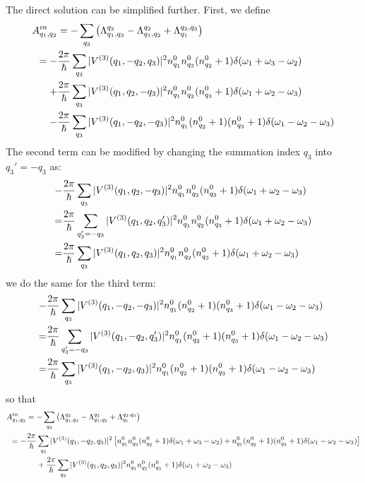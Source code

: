 \documentclass{article}
\begin{document}
The direct solution can be simplified further. First, we define
\begin{align}
    A^{in}_{q_1,q_2} & = - \sum_{q_3} \left( \Lambda_{q_1,q_3}^{q_2} -  \Lambda_{q_1,q_2}^{q_2} + \Lambda^{q_2,q_3}_{q_1} \right) \notag \\
             = -&\frac{2\pi}{\hbar} \sum_{q_3} |V^{(3)}(q_1, -q_2, q_3)|^2 n_{q_1}^0 n_{q_3}^0 (n_{q_2}^0 + 1) \delta(\omega_1 + \omega_3 - \omega_2) \notag \\
               +&\frac{2\pi}{\hbar} \sum_{q_3} |V^{(3)}(q_1, q_2, -q_3)|^2 n_{q_1}^0 n_{q_2}^0 (n_{q_3}^0 + 1) \delta(\omega_1 + \omega_2 - \omega_3) \notag \\
               -&\frac{2\pi}{\hbar} \sum_{q_3} |V^{(3)}(q_1, -q_2, -q_3)|^2 n_{q_1}^0 (n_{q_2}^0+1) (n_{q_3}^0 + 1) \delta(\omega_1 - \omega_2 - \omega_3)
               \label{explicit}
\end{align}
The second term can be modified by changing the summation index $q_3$ into $q_3' = -q_3$ as:
\begin{align}
    -&\frac{2\pi}{\hbar} \sum_{q_3} |V^{(3)}(q_1, q_2, -q_3)|^2 n_{q_1}^0 n_{q_2}^0 (n_{q_3}^0 + 1) \delta(\omega_1 + \omega_2 - \omega_3) \notag \\
    =&\frac{2\pi}{\hbar} \sum_{q_3'=-q_3} |V^{(3)}(q_1, q_2, q_3')|^2 n_{q_1}^0 n_{q_2}^0 (n_{q_3}^0 + 1) \delta(\omega_1 + \omega_2 - \omega_3) \notag \\
    =&\frac{2\pi}{\hbar} \sum_{q_3} |V^{(3)}(q_1, q_2, q_3)|^2 n_{q_1}^0 n_{q_2}^0 (n_{q_3}^0 + 1) \delta(\omega_1 + \omega_2 - \omega_3)
\end{align}
we do the same for the third term:
\begin{align}
    -&\frac{2\pi}{\hbar} \sum_{q_3} |V^{(3)}(q_1, -q_2, -q_3)|^2 n_{q_1}^0 (n_{q_2}^0+1) (n_{q_3}^0 + 1) \delta(\omega_1 - \omega_2 - \omega_3) \notag \\
    =&\frac{2\pi}{\hbar} \sum_{q_3'=-q_3} |V^{(3)}(q_1, -q_2, q_3')|^2 n_{q_1}^0 (n_{q_2}^0+1) (n_{q_3}^0 + 1) \delta(\omega_1 - \omega_2 - \omega_3) \notag \\
    =&\frac{2\pi}{\hbar} \sum_{q_3} |V^{(3)}(q_1, -q_2, q_3)|^2 n_{q_1}^0 (n_{q_2}^0+1) (n_{q_3}^0 + 1) \delta(\omega_1 - \omega_2 - \omega_3)
\end{align}
so that 
\begin{align}
    A^{in}_{q_1,q_2} & = - \sum_{q_3} \left( \Lambda_{q_1,q_3}^{q_2} -  \Lambda_{q_1,q_2}^{q_2} + \Lambda^{q_2,q_3}_{q_1} \right) \notag \\
             = -&\frac{2\pi}{\hbar} \sum_{q_3} |V^{(3)}(q_1, -q_2, q_3)|^2 \left[ n_{q_1}^0 n_{q_3}^0 (n_{q_2}^0 + 1) \delta(\omega_1 + \omega_3 - \omega_2) + n_{q_1}^0 (n_{q_2}^0+1) (n_{q_3}^0 + 1) \delta(\omega_1 - \omega_2 - \omega_3) \right]\notag \\
               & \ \ \ \ +\frac{2\pi}{\hbar} \sum_{q_3} |V^{(3)}(q_1, q_2, q_3)|^2 n_{q_1}^0 n_{q_2}^0 (n_{q_3}^0 + 1) \delta(\omega_1 + \omega_2 - \omega_3) 
\end{align}
\end{document}
